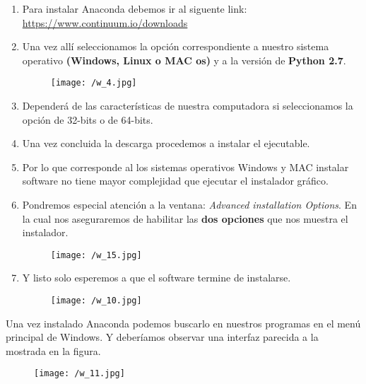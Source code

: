 \documentclass[a4paper, openright, 12pt]{article}
\begin{document}
      \begin{enumerate}
        \item{Para instalar Anaconda debemos ir al siguente link: \url{https://www.continuum.io/downloads} }
        \item{Una vez allí seleccionamos la opción correspondiente a nuestro sistema operativo \textbf{(Windows, Linux o MAC os)} y a la versión de \textbf{Python 2.7}.}\\

        \begin{figure}[ht]
          \centering
          \texttt{[image: /w\_4.jpg]}
        \end{figure}

        \item{Dependerá de las características de nuestra computadora si seleccionamos la opción de 32-bits o de 64-bits.}

        \item{Una vez concluida la descarga procedemos a instalar el ejecutable.}\\

        \item{Por lo que corresponde al los sistemas operativos Windows y MAC instalar software no tiene mayor complejidad que ejecutar el instalador gráfico.}

        \item{Pondremos especial atención a la ventana: \textit{Advanced installation Options}. En la cual nos aseguraremos de habilitar las \textbf{dos opciones} que nos muestra el instalador.}

        \begin{figure}[ht]
          \centering
          \texttt{[image: /w\_15.jpg]}
        \end{figure}

        \item{Y listo solo esperemos a que el software termine de instalarse.}
        \begin{figure}[ht]
          \centering
          \texttt{[image: /w\_10.jpg]}
        \end{figure}

      \end{enumerate}

      Una vez instalado Anaconda podemos buscarlo en nuestros programas en el menú principal de Windows. Y deberíamos observar una interfaz parecida a la mostrada en la figura.\\
      \begin{figure}[ht]
        \centering
        \texttt{[image: /w\_11.jpg]}
      \end{figure}
      \vspace{0.35in}
\end{document}
